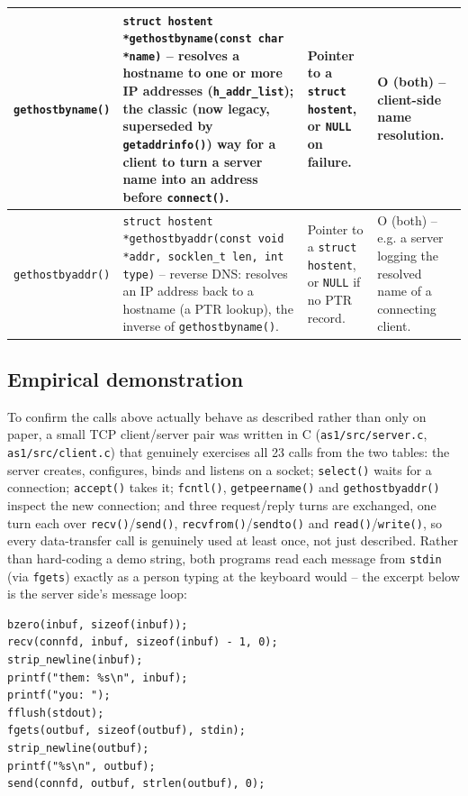 \documentclass[11pt,a4paper]{article}
\begin{document}
\begin{longtable}{|p{2.6cm}|p{6.6cm}|p{2cm}|p{3.6cm}|}
\texttt{gethostbyname()} &
\texttt{struct hostent *gethostbyname(const char *name)} -- resolves a hostname to one or
more IP addresses (\texttt{h\_addr\_list}); the classic (now legacy, superseded by
\texttt{getaddrinfo()}) way for a client to turn a server name into an address before
\texttt{connect()}. &
Pointer to a \texttt{struct hostent}, or \texttt{NULL} on failure. &
O (both) -- client-side name resolution. \\ \hline

\texttt{gethostbyaddr()} &
\texttt{struct hostent *gethostbyaddr(const void *addr, socklen\_t len, int type)} --
reverse DNS: resolves an IP address back to a hostname (a PTR lookup), the inverse of
\texttt{gethostbyname()}. &
Pointer to a \texttt{struct hostent}, or \texttt{NULL} if no PTR record. &
O (both) -- e.g. a server logging the resolved name of a connecting client. \\ \hline

\end{longtable}

\subsection{Empirical demonstration}

To confirm the calls above actually behave as described rather than only on paper, a small
TCP client/server pair was written in C (\texttt{as1/src/server.c},
\texttt{as1/src/client.c}) that genuinely exercises all 23 calls from the two tables: the
server creates, configures, binds and listens on a socket; \texttt{select()} waits for a
connection; \texttt{accept()} takes it; \texttt{fcntl()}, \texttt{getpeername()} and
\texttt{gethostbyaddr()} inspect the new connection; and three request/reply turns are
exchanged, one turn each over \texttt{recv()}/\texttt{send()},
\texttt{recvfrom()}/\texttt{sendto()} and \texttt{read()}/\texttt{write()}, so every
data-transfer call is genuinely used at least once, not just described. Rather than
hard-coding a demo string, both programs read each message from \texttt{stdin} (via
\texttt{fgets}) exactly as a person typing at the keyboard would -- the excerpt below is the
server side's message loop:

\begin{lstlisting}[caption={Excerpt of as1/src/server.c -- interactive message loop}]
bzero(inbuf, sizeof(inbuf));
recv(connfd, inbuf, sizeof(inbuf) - 1, 0);
strip_newline(inbuf);
printf("them: %s\n", inbuf);
printf("you: ");
fflush(stdout);
fgets(outbuf, sizeof(outbuf), stdin);
strip_newline(outbuf);
printf("%s\n", outbuf);
send(connfd, outbuf, strlen(outbuf), 0);
\end{lstlisting}
\end{document}
